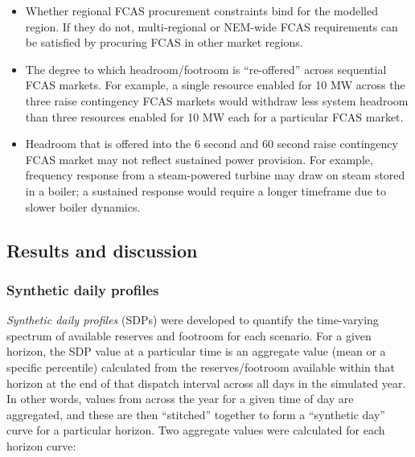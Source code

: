 \documentclass[12pt,a4paper,]{report}
\providecommand{\tightlist}{%
  \setlength{\itemsep}{0pt}\setlength{\parskip}{0pt}}
\begin{document}
\begin{itemize}
\tightlist
\item
  Whether regional FCAS procurement constraints bind for the modelled
  region. If they do not, multi-regional or NEM-wide FCAS requirements
  can be satisfied by procuring FCAS in other market regions.
\item
  The degree to which headroom/footroom is ``re-offered'' across
  sequential FCAS markets. For example, a single resource enabled for 10
  MW across the three raise contingency FCAS markets would withdraw less
  system headroom than three resources enabled for 10 MW each for a
  particular FCAS market.
\item
  Headroom that is offered into the 6 second and 60 second raise
  contingency FCAS market may not reflect sustained power provision. For
  example, frequency response from a steam-powered turbine may draw on
  steam stored in a boiler; a sustained response would require a longer
  timeframe due to slower boiler dynamics.
\end{itemize}

\hypertarget{sec:reserves-results}{%
\subsection{Results and discussion}\label{sec:reserves-results}}

\hypertarget{synthetic-daily-profiles}{%
\subsubsection{Synthetic daily
profiles}\label{synthetic-daily-profiles}}

\emph{Synthetic daily profiles} (SDPs) were developed to quantify the
time-varying spectrum of available reserves and footroom for each
scenario. For a given horizon, the SDP value at a particular time is an
aggregate value (mean or a specific percentile) calculated from the
reserves/footroom available within that horizon at the end of that
dispatch interval across all days in the simulated year. In other words,
values from across the year for a given time of day are aggregated, and
these are then ``stitched'' together to form a ``synthetic day'' curve
for a particular horizon. Two aggregate values were calculated for each
horizon curve:
\end{document}
